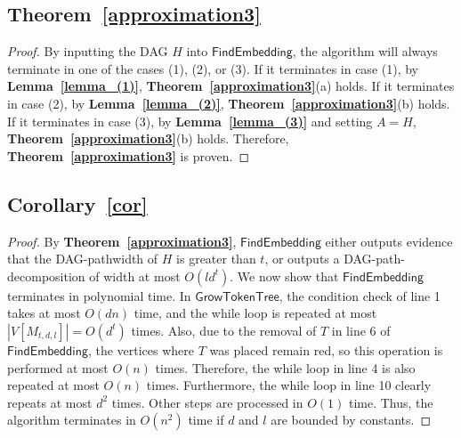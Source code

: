 \documentclass[runningheads]{llncs}
\theoremstyle{plain}
\theoremstyle{definition}
\begin{document}
\subsection{\textbf{Theorem~\ref{approximation3}}}
\begin{proof}
    By inputting the DAG $H$ into $\mathsf{FindEmbedding}$, the algorithm will always terminate in one of the cases (1), (2), or (3). If it terminates in case (1), by \textbf{Lemma~\ref{lemma_(1)}}, \textbf{Theorem~\ref{approximation3}}(a) holds. If it terminates in case (2), by \textbf{Lemma~\ref{lemma_(2)}}, \textbf{Theorem~\ref{approximation3}}(b) holds. If it terminates in case (3), by \textbf{Lemma~\ref{lemma_(3)}} and setting $A = H$, \textbf{Theorem~\ref{approximation3}}(b) holds. Therefore, \textbf{Theorem~\ref{approximation3}} is proven.
\end{proof}


\subsection{\textbf{Corollary~\ref{cor}}}
\begin{proof}
    By \textbf{Theorem~\ref{approximation3}}, $\mathsf{FindEmbedding}$ either outputs evidence that the DAG-pathwidth of $H$ is greater than $t$, or outputs a DAG-path-decomposition of width at most $O(ld^t)$. We now show that $\mathsf{FindEmbedding}$ terminates in polynomial time. In $\mathsf{GrowTokenTree}$, the condition check of line 1 takes at most $O(dn)$ time, and the while loop is repeated at most $|V[M_{t, d, l}]| = O(d^t)$ times. Also, due to the removal of $T$ in line 6 of $\mathsf{FindEmbedding}$, the vertices where $T$ was placed remain red, so this operation is performed at most $O(n)$ times. Therefore, the while loop in line 4 is also repeated at most $O(n)$ times. Furthermore, the while loop in line 10 clearly repeats at most $d^2$ times. Other steps are processed in $O(1)$ time. Thus, the algorithm terminates in $O(n^2)$ time if $d$ and $l$ are bounded by constants.
\end{proof}
\end{document}
